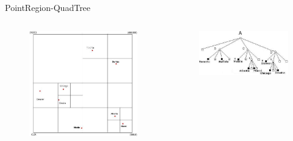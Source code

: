 \documentclass[red, tikz, aspectratio=169, xcolor=dvipsnames]{beamer}
\begin{document}
			\begin{frame}{PointRegion-QuadTree}
				\vspace{-20px}
				\begin{columns}
					\begin{column}{0.48\textwidth}
						\begin{figure}
							\centering
							\includegraphics[width=1\textwidth]{img/prquad_q.jpg}
						\end{figure}
					\end{column}
					\begin{column}{0.5\textwidth}
						\begin{figure}
							\centering
							\includegraphics[width=1\textwidth]{img/prquad_t.jpg}
						\end{figure}
					\end{column}
				\end{columns}
			\end{frame}
\end{document}
